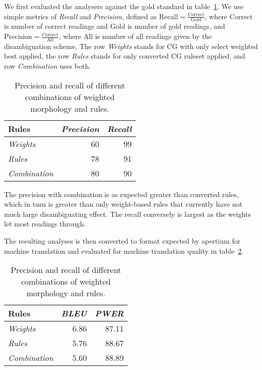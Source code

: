 \documentclass[11pt]{article}
\begin{document}
We first evaluated the analysers against the gold standard in
table~\ref{table:intrinsic}. We use simple metrics of \textit{Recall} and
\textit{Precision}, defined as $\mathrm{Recall} =
\frac{\mathrm{Correct}}{\mathrm{Gold}}$, where Correct is number of correct
readings and Gold is number of gold readings, and $\mathrm{Precision} =
\frac{\mathrm{Correct}}{\mathrm{All}}$, where All is number of all readings
given by the disambiguation scheme. The row \textit{Weights} stands for CG with
only select weighted best applied, the row \textit{Rules} stands for only
converted CG ruleset applied, and row \textit{Combination} uses both.

\begin{table}
    \centering
    \begin{tabular}{|l|r|r|}
        \hline
        \bf Rules & \em Precision & \em Recall \\
        \hline
        \em Weights & 60 & 99 \\
        \hline
        \em Rules & 78  & 91 \\
        \hline
        \em Combination & 80 & 90 \\
        \hline
    \end{tabular}
    \caption{Precision and recall of different combinations of
    weighted morphology and rules.\label{table:intrinsic}}
\end{table}

The precision with combination is as expected greater than converted rules,
which in turn is greater than only weight-based rules that currently have not
much large disambiguating effect. The recall conversely is largest as the
weights let most readings through.


The resulting analyses is then converted to format expected by apertium for
machine translation and evaluated for machine translation quality in
table~\ref{table:extrinsic}.

\begin{table}
    \centering
    \begin{tabular}{|l|r|r|}
        \hline
        \bf Rules & \em BLEU & \em PWER \\
        \hline
        \em Weights & 6.86 & 87.11 \\
        \hline
        \em Rules & 5.76  & 88.67 \\
        \hline
        \em Combination & 5.60 & 88.89 \\
        \hline
    \end{tabular}
    \caption{Precision and recall of different combinations of
    weighted morphology and rules.\label{table:extrinsic}}
\end{table}
\end{document}
